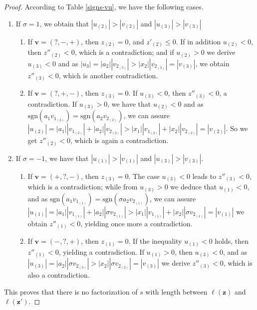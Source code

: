 \documentclass[11pt]{amsart}
\theoremstyle{remark}
\begin{document}
\begin{proof}
According to Table \ref{signs-vu}, we have the following cases.
\begin{enumerate}
	\item If $\sigma=1$, we obtain that $|u_{(2)}|>|v_{(2)}|$ and $|u_{(3)}|>|v_{(3)}|$
  \begin{enumerate}
  	\item If $\mathbf v=(?,-,+)$, then $z_{(2)}=0$, and $z'_{(2)}\le 0$. If in addition $u_{(2)}<0$, then  $z''_{(2)}<0$, which is a contradiction; and if  $u_{(2)}>0$ we derive $u_{(3)}<0$ and as $|u_3|=|a_2||v_{2_{(3)}}|>|x_2||v_{2_{(3)}}|=|v_{(3)}|$, we obtain $z''_{(3)}<0$, which is another contradiction.
  	\item If $\mathbf v=(?,+,-)$, then $z_{(3)}=0$. If $u_{(3)}<0$, then $z''_{(3)}<0$, a contradiction. If $u_{(3)}>0$, we have that $u_{(2)}<0$ and as $\mathrm{sgn}(a_1v_{1_{(2)}})=\mathrm{sgn}(a_2v_{2_{(2)}})$, we can assure $|u_{(2)}|=|a_1||v_{1_{(2)}}|+|a_2||v_{2_{(2)}}|>|x_1||v_{1_{(2)}}|+|x_2||v_{2_{(2)}}|=|v_{(2)}|$. So we get $z''_{(2)}<0$, which is again a contradiction.
  \end{enumerate}
    \item If $\sigma=-1$, we have that $|u_{(1)}|>|v_{(1)}|$ and $|u_{(3)}|>|v_{(3)}|$.
  \begin{enumerate}   
   \item If $\mathbf v=(+,?,-)$, then $z_{(3)}=0$. The case $u_{(3)}<0$ leads to $z''_{(3)}<0$, which is a contradiction; while from $u_{(3)}>0$ we deduce that $u_{(1)}<0$, and as $\mathrm{sgn}(a_1v_{1_{(1)}})=\mathrm{sgn}(\sigma a_2v_{2_{(1)}})$, we can assure $|u_{(1)}|=|a_1||v_{1_{(1)}}|+|a_2||\sigma v_{2_{(1)}}|>|x_1||v_{1_{(1)}}|+|x_2||\sigma v_{2_{(1)}}|=|v_{(1)}|$ we obtain $z''_{(1)}<0$, yielding once more a contradiction.
   \item If $\mathbf v=(-,?,+)$, then $z_{(1)}=0$. If the inequality $u_{(1)}<0$ holds, then $z''_{(1)}<0$, yielding a contradiction. If  $u_{(1)}>0$, then $u_{(3)}<0$, and as  $|u_{(3)}|=|a_2||\sigma v_{2_{(3)}}|>|x_2||\sigma v_{2_{(3)}}|=|v_{(3)}|$ we derive $z''_{(3)}<0$, which is also a contradiction.
  \end{enumerate}
\end{enumerate}

This proves that there is no factorization of $s$ with length between  $\ell(\mathbf z)$ and $\ell(\mathbf z')$.  
\end{proof}
\end{document}
